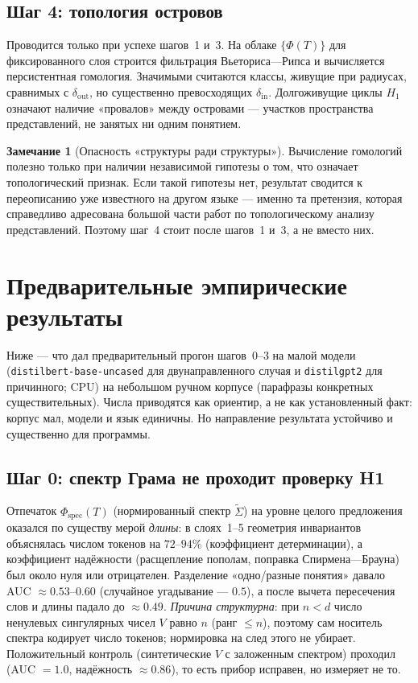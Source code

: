 \documentclass[11pt,a4paper]{article}
\theoremstyle{definition}
\newtheorem{remark}[definition]{Замечание}
\theoremstyle{plain}
\begin{document}
\subsection{Шаг 4: топология островов}\label{sec:topology}

Проводится только при успехе шагов~1 и~3. На облаке $\{\Phi(T)\}$ для фиксированного слоя
строится фильтрация Вьеториса—Рипса и вычисляется персистентная гомология. Значимыми считаются
классы, живущие при радиусах, сравнимых с $\delta_{\mathrm{out}}$, но существенно превосходящих
$\delta_{\mathrm{in}}$. Долгоживущие циклы $H_1$ означают наличие «провалов» между островами —
участков пространства представлений, не занятых ни одним понятием.

\begin{remark}[Опасность «структуры ради структуры»]
Вычисление гомологий полезно только при наличии независимой гипотезы о том, что означает
топологический признак. Если такой гипотезы нет, результат сводится к переописанию уже
известного на другом языке — именно та претензия, которая справедливо адресована большой части
работ по топологическому анализу представлений. Поэтому шаг~4 стоит после шагов~1 и~3, а
не вместо них.
\end{remark}

\section{Предварительные эмпирические результаты}\label{sec:prelim}

Ниже — что дал предварительный прогон шагов~0--3 на малой модели
(\texttt{distilbert-base-uncased} для двунаправленного случая и \texttt{distilgpt2}
для причинного; CPU) на небольшом ручном корпусе (парафразы конкретных
существительных). Числа приводятся как ориентир, а не как установленный факт: корпус
мал, модели и язык единичны. Но направление результата устойчиво и существенно для
программы.

\subsection{Шаг 0: спектр Грама не проходит проверку H1}

Отпечаток $\Phi_{\mathrm{spec}}(T)$ (нормированный спектр $\tilde\Sigma$) на уровне
целого предложения оказался по существу мерой \emph{длины}: в слоях~1--5 геометрия
инвариантов объяснялась числом токенов на $72$--$94\%$ (коэффициент детерминации), а
коэффициент надёжности (расщепление пополам, поправка Спирмена—Брауна) был около нуля
или отрицателен. Разделение «одно/разные понятия» давало AUC $\approx0.53$--$0.60$
(случайное угадывание — $0.5$), а после вычета пересечения слов и длины падало до
$\approx0.49$. \emph{Причина структурна}: при $n<d$ число ненулевых сингулярных чисел
$V$ равно $n$ (ранг $\le n$), поэтому сам носитель спектра кодирует число токенов;
нормировка на след этого не убирает. Положительный контроль (синтетические $V$ с
заложенным спектром) проходил (AUC $=1.0$, надёжность $\approx0.86$), то есть прибор
исправен, но измеряет не то.
\end{document}

